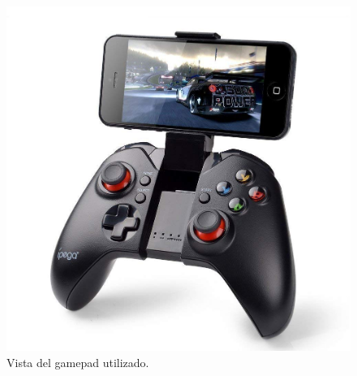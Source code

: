 \begin{figure}[H]
  \begin{center}
    \includegraphics[scale=0.18]{imagenes/robot/control_pad.jpg}
  \end{center}
  \caption{Vista del gamepad utilizado.}
  \label{figura:control_pad}
\end{figure}